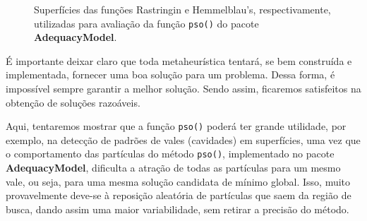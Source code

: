 \documentclass[10pt,letterpaper]{article}
\begin{document}
\begin{figure}[H]
	\centering
	
	\caption{Superfícies das funções Rastringin e Hemmelblau's, respectivamente, utilizadas para avaliação da função \texttt{pso()} do pacote \textbf{AdequacyModel}.}
\end{figure}


É importante deixar claro que toda metaheurística tentará, se bem construída e implementada, fornecer uma boa solução para um problema. Dessa forma, é impossível sempre garantir a melhor solução. Sendo assim, ficaremos satisfeitos na obtenção de soluções razoáveis. 

Aqui, tentaremos mostrar que a função \texttt{pso()} poderá ter grande utilidade, por exemplo, na detecção de padrões de vales (cavidades) em superfícies, uma vez que o comportamento das partículas do método \texttt{pso()}, implementado no pacote \textbf{AdequacyModel}, dificulta a atração de todas as partículas para um mesmo vale, ou seja, para uma mesma solução candidata de mínimo global. Isso, muito provavelmente deve-se à reposição aleatória de partículas que saem da região de busca, dando assim uma maior variabilidade, sem retirar a precisão do método.
 
\end{document}
